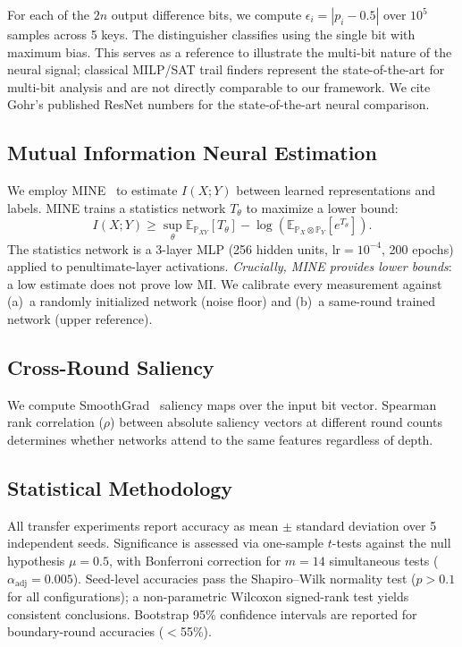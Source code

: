 \documentclass[runningheads]{llncs}
\begin{document}
For each of the $2n$ output difference bits, we compute $\epsilon_i = |p_i - 0.5|$ over $10^5$ samples across 5 keys.
The distinguisher classifies using the single bit with maximum bias.
This serves as a reference to illustrate the multi-bit nature of the neural signal; classical MILP/SAT trail finders represent the state-of-the-art for multi-bit analysis and are not directly comparable to our framework.
We cite Gohr's published ResNet numbers for the state-of-the-art neural comparison.

\subsection{Mutual Information Neural Estimation}

We employ MINE~\cite{belghazi2018mine} to estimate $I(X; Y)$ between learned representations and labels.
MINE trains a statistics network $T_\theta$ to maximize a lower bound:
\begin{equation}
\label{eq:mine}
I(X; Y) \ge \sup_{\theta} \mathbb{E}_{\mathbb{P}_{XY}}[T_\theta] - \log\!\left(\mathbb{E}_{\mathbb{P}_X \otimes \mathbb{P}_Y}[e^{T_\theta}]\right).
\end{equation}
The statistics network is a 3-layer MLP (256 hidden units, $\text{lr} = 10^{-4}$, 200 epochs) applied to penultimate-layer activations.
\emph{Crucially, MINE provides lower bounds}: a low estimate does not prove low MI.
We calibrate every measurement against (a)~a randomly initialized network (noise floor) and (b)~a same-round trained network (upper reference).

\subsection{Cross-Round Saliency}

We compute SmoothGrad~\cite{smilkov2017smoothgrad} saliency maps over the input bit vector.
Spearman rank correlation ($\rho$) between absolute saliency vectors at different round counts determines whether networks attend to the same features regardless of depth.

\subsection{Statistical Methodology}

All transfer experiments report accuracy as mean $\pm$ standard deviation over 5 independent seeds.
Significance is assessed via one-sample $t$-tests against the null hypothesis $\mu = 0.5$, with Bonferroni correction for $m = 14$ simultaneous tests ($\alpha_{\mathrm{adj}} = 0.005$).
Seed-level accuracies pass the Shapiro--Wilk normality test ($p > 0.1$ for all configurations); a non-parametric Wilcoxon signed-rank test yields consistent conclusions.
Bootstrap 95\% confidence intervals are reported for boundary-round accuracies ($<$55\%).
\end{document}
